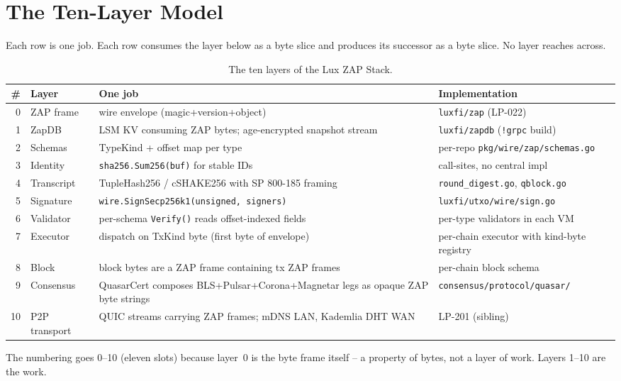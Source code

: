\section{The Ten-Layer Model}
\label{sec:tenlayer}

Each row is one job. Each row consumes the layer below as a byte slice
and produces its successor as a byte slice. No layer reaches across.

\begin{table}[h]
\centering
\small
\begin{tabular}{@{}rlll@{}}
\toprule
\textbf{\#} & \textbf{Layer} & \textbf{One job} & \textbf{Implementation} \\
\midrule
0 & ZAP frame & wire envelope (magic+version+object) & \texttt{luxfi/zap} (LP-022) \\
1 & ZapDB & LSM KV consuming ZAP bytes; age-encrypted snapshot stream & \texttt{luxfi/zapdb} (\texttt{!grpc} build) \\
2 & Schemas & TypeKind + offset map per type & per-repo \texttt{pkg/wire/zap/schemas.go} \\
3 & Identity & \texttt{sha256.Sum256(buf)} for stable IDs & call-sites, no central impl \\
4 & Transcript & TupleHash256 / cSHAKE256 with SP 800-185 framing & \texttt{round\_digest.go}, \texttt{qblock.go} \\
5 & Signature & \texttt{wire.SignSecp256k1(unsigned, signers)} & \texttt{luxfi/utxo/wire/sign.go} \\
6 & Validator & per-schema \texttt{Verify()} reads offset-indexed fields & per-type validators in each VM \\
7 & Executor & dispatch on TxKind byte (first byte of envelope) & per-chain executor with kind-byte registry \\
8 & Block & block bytes are a ZAP frame containing tx ZAP frames & per-chain block schema \\
9 & Consensus & QuasarCert composes BLS+Pulsar+Corona+Magnetar legs as opaque ZAP byte strings & \texttt{consensus/protocol/quasar/} \\
10 & P2P transport & QUIC streams carrying ZAP frames; mDNS LAN, Kademlia DHT WAN & LP-201 (sibling) \\
\bottomrule
\end{tabular}
\caption{The ten layers of the Lux ZAP Stack.}
\label{tab:tenlayer}
\end{table}

The numbering goes 0--10 (eleven slots) because layer~0 is the byte
frame itself -- a property of bytes, not a layer of work. Layers 1--10
are the work.

